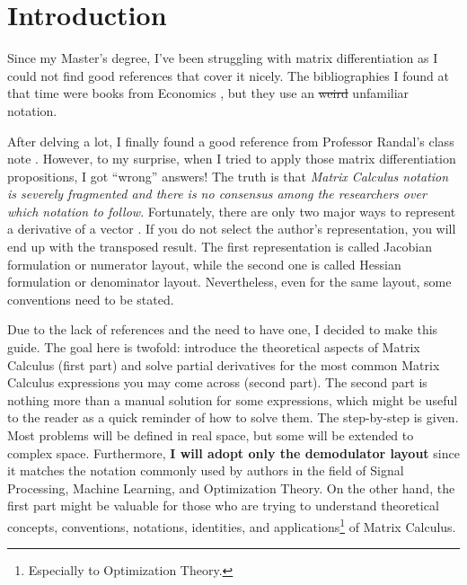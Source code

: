 \section{Introduction}
Since my Master's degree, I've been struggling with matrix differentiation as I could not find good references that cover it nicely. The bibliographies I found at that time were books from Economics \cite{dhrymes1978mathematics}, but they use an \st{weird} unfamiliar notation.

After delving a lot, I finally found a good reference from Professor Randal's class note \cite{barnes2006matrix}. However, to my surprise, when I tried to apply those matrix differentiation propositions, I got ``wrong'' answers! The truth is that \emph{Matrix Calculus notation is severely fragmented and there is no consensus among the researchers over which notation to follow}. Fortunately, there are only two major ways to represent a derivative of a vector \cite{Singh}. If you do not select the author's representation, you will end up with the transposed result. The first representation is called Jacobian formulation or numerator layout, while the second one is called Hessian formulation or denominator layout. Nevertheless, even for the same layout, some conventions need to be stated.

Due to the lack of references and the need to have one, I decided to make this guide. The goal here is twofold: introduce the theoretical aspects of Matrix Calculus (first part) and solve partial derivatives for the most common Matrix Calculus expressions you may come across (second part). The second part is nothing more than a manual solution for some expressions, which might be useful to the reader as a quick reminder of how to solve them. The step-by-step is given. Most problems will be defined in real space, but some will be extended to complex space. Furthermore, \textbf{I will adopt only the demodulator layout} since it matches the notation commonly used by authors in the field of Signal Processing, Machine Learning, and Optimization Theory. On the other hand, the first part might be valuable for those who are trying to understand theoretical concepts, conventions, notations, identities, and applications\footnote{Especially to Optimization Theory.} of Matrix Calculus.

